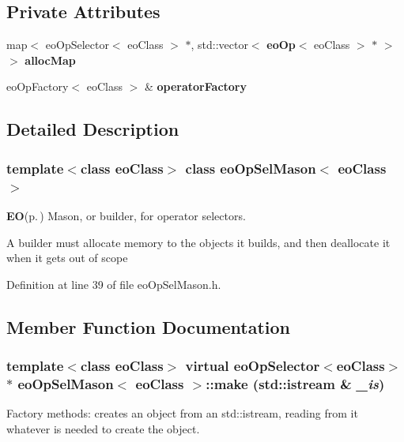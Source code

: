 \subsection*{Private Attributes}
\begin{CompactItemize}
\item 
map$<$ eo\-Op\-Selector$<$ eo\-Class $>$ $\ast$, std::vector$<$ {\bf eo\-Op}$<$ eo\-Class $>$ $\ast$ $>$ $>$ {\bf alloc\-Map}\label{classeo_op_sel_mason_r0}

\item 
eo\-Op\-Factory$<$ eo\-Class $>$ \& {\bf operator\-Factory}\label{classeo_op_sel_mason_r1}

\end{CompactItemize}


\subsection{Detailed Description}
\subsubsection*{template$<$class eo\-Class$>$ class eo\-Op\-Sel\-Mason$<$ eo\-Class $>$}

{\bf EO}{\rm (p.\,\pageref{class_e_o})} Mason, or builder, for operator selectors. 

A builder must allocate memory to the objects it builds, and then deallocate it when it gets out of scope 



Definition at line 39 of file eo\-Op\-Sel\-Mason.h.

\subsection{Member Function Documentation}
\subsubsection{\setlength{\rightskip}{0pt plus 5cm}template$<$class eo\-Class$>$ virtual eo\-Op\-Selector$<$eo\-Class$>$$\ast$ {\bf eo\-Op\-Sel\-Mason}$<$ eo\-Class $>$::make (std::istream \& {\em \_\-is})\hspace{0.3cm}{\tt  [inline, virtual]}}\label{classeo_op_sel_mason_a0}


Factory methods: creates an object from an std::istream, reading from it whatever is needed to create the object. 

